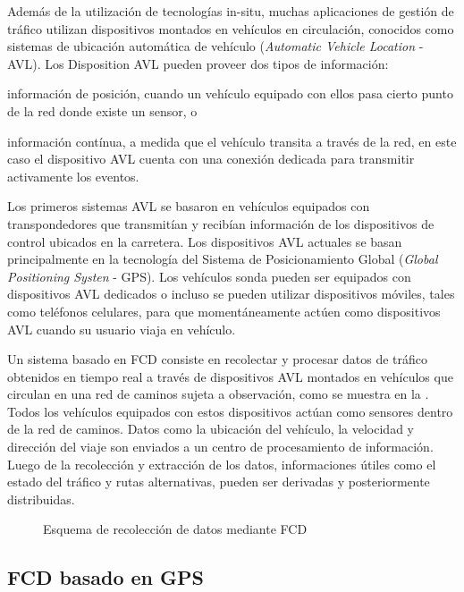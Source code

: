 Además de la utilización de tecnologías in-situ, muchas aplicaciones de gestión de tráfico utilizan dispositivos montados en vehículos en circulación, conocidos como sistemas de ubicación automática de vehículo (\emph{Automatic Vehicle Location} - AVL). Los Disposition AVL pueden proveer dos tipos de información: \begin{enumerate*}[a)]
\item información de posición, cuando un vehículo equipado con ellos pasa cierto punto de la red donde existe un sensor, o \item información contínua, a medida que el vehículo transita a través de la red, en este caso el dispositivo AVL cuenta con una conexión dedicada para transmitir activamente los eventos.
\end{enumerate*}

Los primeros sistemas AVL se basaron en vehículos equipados con transpondedores que transmitían y recibían información de los dispositivos de control ubicados en la carretera. Los dispositivos AVL actuales se basan principalmente en la tecnología del Sistema de Posicionamiento Global (\emph{Global Positioning Systen} - GPS). Los vehículos sonda pueden ser equipados con dispositivos AVL dedicados o incluso se pueden utilizar dispositivos móviles, tales como teléfonos celulares, para que momentáneamente actúen como dispositivos AVL cuando su usuario viaja en vehículo.  

Un sistema basado en FCD consiste en recolectar y procesar datos de tráfico obtenidos en tiempo real a través de dispositivos AVL montados en vehículos que circulan en una red de caminos sujeta a observación, como se muestra en la . Todos los vehículos equipados con estos dispositivos actúan como sensores dentro de la red de caminos. Datos como la ubicación del vehículo, la velocidad y dirección del viaje son enviados a un centro de procesamiento de información. Luego de la recolección y extracción de los datos, informaciones útiles como el estado del tráfico y rutas alternativas, pueden ser derivadas y posteriormente distribuidas.

\begin{figure}[h]
	\centering
	
	\caption{Esquema de recolección de datos mediante FCD}
	\label{fig:ComunicacionGPS} 	
\end{figure}

\subsection{FCD basado en GPS}

